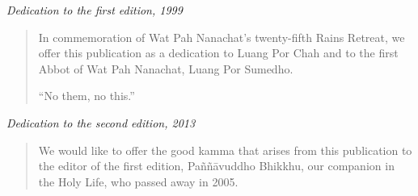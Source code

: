 
\cleartoverso
\thispagestyle{empty}
\vspace*{4\baselineskip}

\emph{Dedication to the first edition, 1999}

\begin{quote}
In commemoration of Wat Pah Nanachat's twenty-fifth Rains Retreat, we
offer this publication as a dedication to Luang Por Chah and to the
first Abbot of Wat Pah Nanachat, Luang Por Sumedho.
\bigskip

``No them, no this.''
\end{quote}

\vspace*{2\baselineskip}
\emph{Dedication to the second edition, 2013}

\begin{quote}
We would like to offer the good kamma that arises from this publication
to the editor of the first edition, Paññāvuddho Bhikkhu, our companion
in the Holy Life, who passed away in 2005.
\end{quote}

